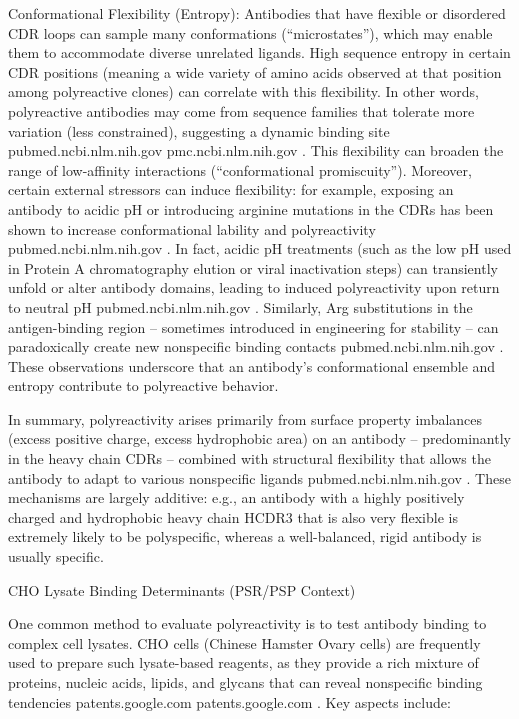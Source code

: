 Conformational Flexibility (Entropy): Antibodies that have flexible or disordered CDR loops can sample many conformations (“microstates”), which may enable them to accommodate diverse unrelated ligands. High sequence entropy in certain CDR positions (meaning a wide variety of amino acids observed at that position among polyreactive clones) can correlate with this flexibility. In other words, polyreactive antibodies may come from sequence families that tolerate more variation (less constrained), suggesting a dynamic binding site
pubmed.ncbi.nlm.nih.gov
pmc.ncbi.nlm.nih.gov
. This flexibility can broaden the range of low-affinity interactions (“conformational promiscuity”). Moreover, certain external stressors can induce flexibility: for example, exposing an antibody to acidic pH or introducing arginine mutations in the CDRs has been shown to increase conformational lability and polyreactivity
pubmed.ncbi.nlm.nih.gov
. In fact, acidic pH treatments (such as the low pH used in Protein A chromatography elution or viral inactivation steps) can transiently unfold or alter antibody domains, leading to induced polyreactivity upon return to neutral pH
pubmed.ncbi.nlm.nih.gov
. Similarly, Arg substitutions in the antigen-binding region – sometimes introduced in engineering for stability – can paradoxically create new nonspecific binding contacts
pubmed.ncbi.nlm.nih.gov
. These observations underscore that an antibody’s conformational ensemble and entropy contribute to polyreactive behavior.

In summary, polyreactivity arises primarily from surface property imbalances (excess positive charge, excess hydrophobic area) on an antibody – predominantly in the heavy chain CDRs – combined with structural flexibility that allows the antibody to adapt to various nonspecific ligands
pubmed.ncbi.nlm.nih.gov
. These mechanisms are largely additive: e.g., an antibody with a highly positively charged and hydrophobic heavy chain HCDR3 that is also very flexible is extremely likely to be polyspecific, whereas a well-balanced, rigid antibody is usually specific.

CHO Lysate Binding Determinants (PSR/PSP Context)

One common method to evaluate polyreactivity is to test antibody binding to complex cell lysates. CHO cells (Chinese Hamster Ovary cells) are frequently used to prepare such lysate-based reagents, as they provide a rich mixture of proteins, nucleic acids, lipids, and glycans that can reveal nonspecific binding tendencies
patents.google.com
patents.google.com
. Key aspects include:

